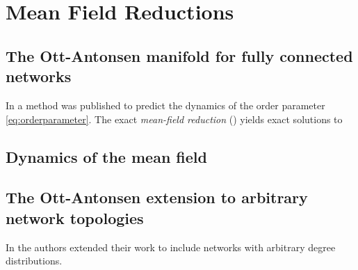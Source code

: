 \newpage
\section{Mean Field Reductions}
\subsection{The Ott-Antonsen manifold for fully connected networks}
In \cite{OttAntonsen2008, OttAntonsen2009, OttAntonsen2010} a method was published to predict the dynamics of the order parameter \eqref{eq:orderparameter}. The exact \textsl{mean-field reduction} (\MFR) yields exact solutions to 

\subsection{Dynamics of the mean field}

\subsection{The Ott-Antonsen extension to arbitrary network topologies}
In \cite{OttAntonsen2017} the authors extended their work to include networks with arbitrary degree distributions.